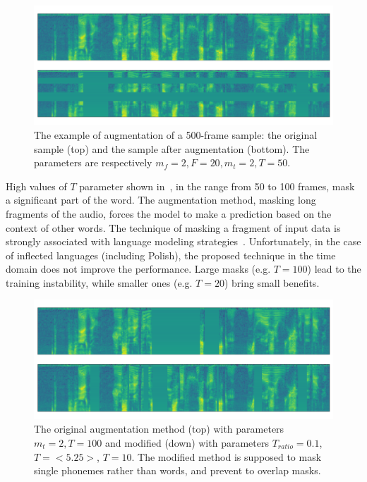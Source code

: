\begin{figure}[!h]
    \centering
    \includegraphics[width=12cm]{figures/data-augmentation-1.png}
    \caption{
The example of augmentation of a 500-frame sample:
the original sample (top) and the sample after augmentation (bottom).
The parameters are respectively $m_f=2, F=20, m_t=2, T=50$.
}
    \label{fig:data_augmentation_1}
\end{figure}

High values of $T$ parameter shown in~\cite{park2019}, in the range from 50 to 100 frames,
mask a significant part of the word.
The augmentation method, masking long fragments of the audio, forces the model
to make a prediction based on the context of other words.
The technique of masking a fragment of input data is strongly associated with language
modeling strategies~\cite{mikolov2013,peters2018,howard2018,devlin2019}.
Unfortunately, in the case of inflected languages (including Polish), the proposed technique in the time domain
does not improve the performance.
Large masks (e.g. $T=100$) lead to the training instability, while smaller
ones (e.g. $T=20$) bring small benefits.

\begin{figure}[!h]
    \centering
    \includegraphics[width=12cm]{figures/data-augmentation-2.png}
    \caption{
The original augmentation method (top) with parameters $m_t=2, T=100$ and modified
(down) with parameters $T_{ratio}=0.1$, $T=<5.25>$, $T=10$.
The modified method is supposed to mask single phonemes rather than words, and prevent to overlap masks.
}
    \label{fig:data_augmentation_2}
\end{figure}

